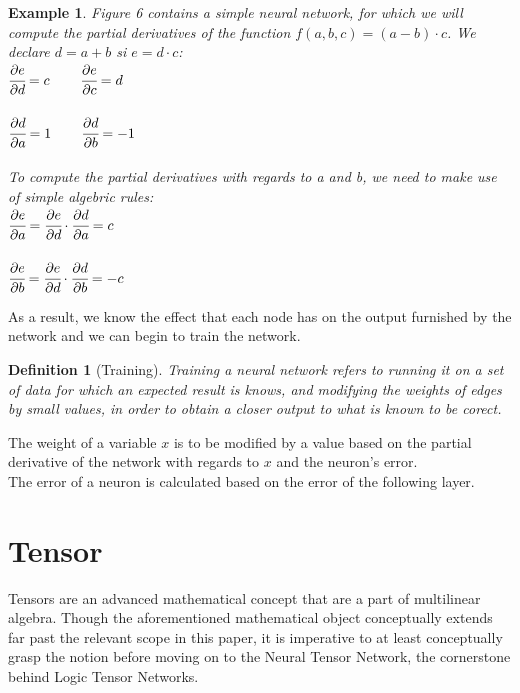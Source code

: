 \documentclass{article}
\newtheorem{definition}{Definition}[section]
\newtheorem{example}{Example}[section]
\begin{document}
\begin{example}
Figure 6 contains a simple neural network, for which we will compute the partial derivatives of the function $f(a, b, c) = (a - b) \cdot c$. We declare $d = a + b$ si $e = d \cdot c$:\\
$\cfrac{\partial e}{\partial d} = c$\ \ \ \ 
$\cfrac{\partial e}{\partial c} = d$\\ \\
$\cfrac{\partial d}{\partial a} = 1$\ \ \ \ 
$\cfrac{\partial d}{\partial b} = -1$\\ \\
To compute the partial derivatives with regards to a and b, we need to make use of simple algebric rules:\\
$\cfrac{\partial e}{\partial a} = \cfrac{\partial e}{\partial d} \cdot \cfrac{\partial d}{\partial a} = c$ \\ \\ 
$\cfrac{\partial e}{\partial b} = \cfrac{\partial e}{\partial d} \cdot \cfrac{\partial d}{\partial b} = -c$ \\
\end{example}

As a result, we know the effect that each node has on the output furnished by the network and we can begin to train the network.

\begin{definition}[Training]
Training a neural network refers to running it on a set of data for which an expected result is knows, and modifying the weights of edges by small values, in order to obtain a closer output to what is known to be corect.
\end{definition}

The weight of a variable $x$ is to be modified by a value based on the partial derivative of the network with regards to $x$ and the neuron's error.\\
The error of a neuron is calculated based on the error of the following layer.

\section{Tensor}
Tensors are an advanced mathematical concept that are a part of multilinear algebra. Though the aforementioned mathematical object conceptually extends far past the relevant scope in this paper, it is imperative  to at least conceptually grasp the notion before moving on to the Neural Tensor Network, the cornerstone behind Logic Tensor Networks.
\end{document}
